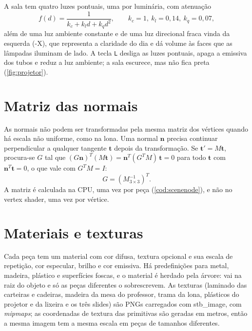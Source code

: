 \documentclass[
  12pt,          %
  oneside,       %
  a4paper,       %
  chapter=TITLE, %
  english,
  brazil,        %
]{abntex2}
\begin{document}
A sala tem quatro luzes pontuais, uma por luminária, com atenuação
\begin{equation}
  f(d) = \frac{1}{k_c + k_l d + k_q d^2}, \qquad k_c = 1,\ k_l = 0{,}14,\ k_q = 0{,}07,
\end{equation}
além de uma luz ambiente constante e de uma luz direcional fraca vinda da esquerda (-X), que representa a
claridade do dia e dá volume às faces que as lâmpadas iluminam de lado. A tecla \texttt{L} desliga as luzes
pontuais, apaga a emissiva dos tubos e reduz a luz ambiente; a sala escurece, mas não fica preta
(\autoref{fig:projetor}).

\section{Matriz das normais}
\label{sec:normais}

As normais não podem ser transformadas pela mesma matriz dos vértices quando há escala não uniforme, como na
lona. Uma normal $\mathbf{n}$ precisa continuar perpendicular a qualquer tangente $\mathbf{t}$ depois da
transformação. Se $\mathbf{t}' = M\mathbf{t}$, procura-se $G$ tal que
$(G\mathbf{n})^T (M\mathbf{t}) = \mathbf{n}^T (G^T M)\, \mathbf{t} = 0$ para todo $\mathbf{t}$ com
$\mathbf{n}^T\mathbf{t} = 0$, o que vale com $G^T M = I$:
\begin{equation}
  G = \left(M_{3\times3}^{-1}\right)^T .
\end{equation}
A matriz é calculada na CPU, uma vez por peça (\autoref{cod:scenenode}), e não no vertex shader, uma vez por
vértice.

\section{Materiais e texturas}

Cada peça tem um material com cor difusa, textura opcional e sua escala de repetição, cor especular, brilho e
cor emissiva. Há predefinições para metal, madeira, plástico e superfícies foscas, e o material é herdado
pela árvore: vai na raiz do objeto e só as peças diferentes o sobrescrevem. As texturas (laminado das
carteiras e cadeiras, madeira da mesa do professor, trama da lona, plásticos do projetor e da lixeira e os três
slides) são PNGs carregados com stb\_image, com \emph{mipmaps}; as coordenadas de textura das primitivas são
geradas em metros, então a mesma imagem tem a mesma escala em peças de tamanhos diferentes.

\end{document}
